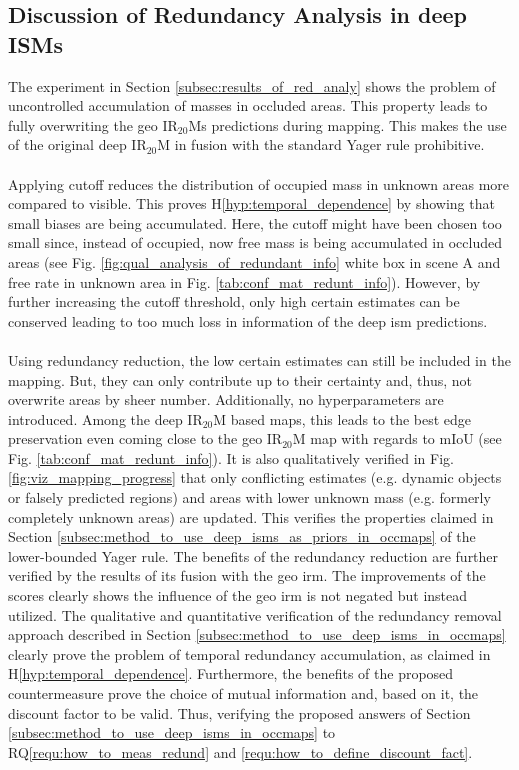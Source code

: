 \subsection{Discussion of Redundancy Analysis in deep ISMs}
\label{subsec:discussion_of_red_analy}
The experiment in Section \ref{subsec:results_of_red_analy} shows the problem of uncontrolled accumulation of masses in occluded areas. This property leads to fully overwriting the geo IR$_{20}$Ms predictions during mapping. This makes the use of the original deep IR$_{20}$M in fusion with the standard Yager rule prohibitive. 
\\\\
Applying cutoff reduces the distribution of occupied mass in unknown areas more compared to visible. This proves H\ref{hyp:temporal_dependence} by showing that small biases are being accumulated. Here, the cutoff might have been chosen too small since, instead of occupied, now free mass is being accumulated in occluded areas (see Fig. \ref{fig:qual_analysis_of_redundant_info} white box in scene A and free rate in unknown area in Fig. \ref{tab:conf_mat_redunt_info}). However, by further increasing the cutoff threshold, only high certain estimates can be conserved leading to too much loss in information of the deep \gls{ism} predictions. 
\\\\
Using redundancy reduction, the low certain estimates can still be included in the mapping. But, they can only contribute up to their certainty and, thus, not overwrite areas by sheer number. Additionally, no hyperparameters are introduced. Among the deep IR$_{20}$M based maps, this leads to the best edge preservation even coming close to the geo IR$_{20}$M map with regards to mIoU (see Fig. \ref{tab:conf_mat_redunt_info}). It is also qualitatively verified in Fig. \ref{fig:viz_mapping_progress} that only conflicting estimates (e.g. dynamic objects or falsely predicted regions) and areas with lower unknown mass (e.g. formerly completely unknown areas) are updated. This verifies the properties claimed in Section \ref{subsec:method_to_use_deep_isms_as_priors_in_occmaps} of the lower-bounded Yager rule. The benefits of the redundancy reduction are further verified by the results of its fusion with the geo \gls{irm}. The improvements of the scores clearly shows the influence of the geo \gls{irm} is not negated but instead utilized. The qualitative and quantitative verification of the redundancy removal approach described in Section \ref{subsec:method_to_use_deep_isms_in_occmaps} clearly prove the problem of temporal redundancy accumulation, as claimed in H\ref{hyp:temporal_dependence}. Furthermore, the benefits of the proposed countermeasure prove the choice of mutual information and, based on it, the discount factor to be valid. Thus, verifying the proposed answers of Section \ref{subsec:method_to_use_deep_isms_in_occmaps} to RQ\ref{requ:how_to_meas_redund} and \ref{requ:how_to_define_discount_fact}.
